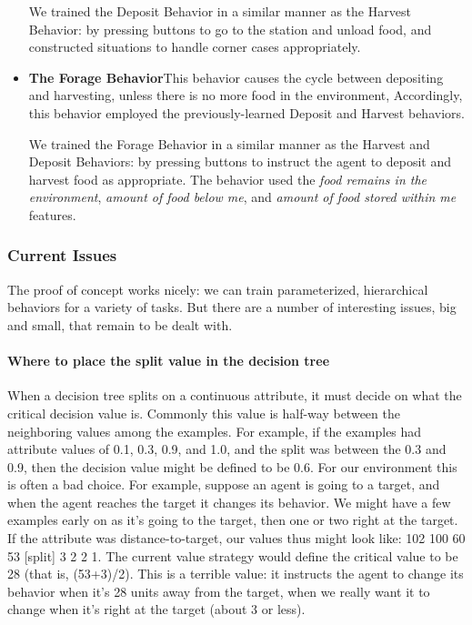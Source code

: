 \documentclass[11pt]{article}
\begin{document}
\begin{itemize}
We trained the Deposit Behavior in a similar manner as the Harvest Behavior: by pressing buttons to go to the station and unload food, and constructed situations to handle corner cases appropriately.

\item {\bf The Forage Behavior}\quad This behavior causes the cycle between depositing and harvesting, unless there is no more food in the environment,  Accordingly, this behavior employed the previously-learned Deposit and Harvest behaviors.

We trained the Forage Behavior in a similar manner as the Harvest and Deposit Behaviors: by pressing buttons to instruct the agent to deposit and harvest food as appropriate.  The behavior used the {\it food remains in the environment}, {\it amount of food below me}, and {\it amount of food stored within me} features.

\end{itemize}


\subsubsection*{Current Issues}

The proof of concept works nicely: we can train parameterized, hierarchical behaviors for a variety of tasks.  But there are a number of interesting issues, big and small, that remain to be dealt with.

\paragraph{Where to place the split value in the decision tree}  When a decision tree splits on a continuous attribute, it must decide on what the critical decision value is.  Commonly this value is half-way between the neighboring values among the examples.  For example, if the examples had attribute values of 0.1, 0.3, 0.9, and 1.0, and the split was between the 0.3 and 0.9, then the decision value might be defined to be 0.6.  For our environment this is often a bad choice.  For example, suppose an agent is going to a target, and when the agent reaches the target it changes its behavior.  We might have a few examples early on as it's going to the target, then one or two right at the target.  If the attribute was distance-to-target, our values thus might look like: 102 100 60 53 [split] 3 2 2 1.  The current value strategy would define the critical value to be 28 (that is, (53+3)/2).  This is a terrible value: it instructs the agent to change its behavior when it's 28 units away from the target, when we really want it to change when it's right at the target (about 3 or less).
\end{document}
